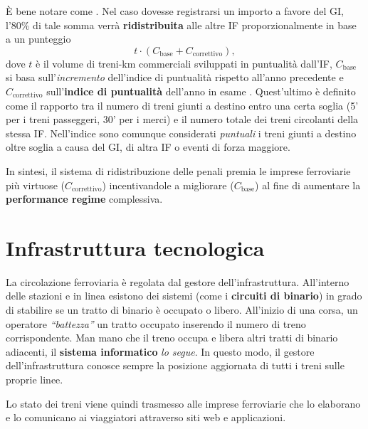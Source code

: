 \documentclass[12pt,italian]{report}
\begin{document}
È bene notare come . Nel caso dovesse registrarsi un importo a favore
del GI, l'80\% di tale somma verrà \textbf{ridistribuita} alle altre
IF proporzionalmente in base a un punteggio
$$
t \cdot (C_\text{base} + C_\text{correttivo}),
$$
dove $t$ è il volume di treni-km commerciali sviluppati in puntualità
dall'IF, $C_\text{base}$ si basa sull'\textit{incremento} dell'indice
di puntualità rispetto all'anno precedente \cite[app.\ 5C, tabella
5a]{RfiPir} e $C_\text{correttivo}$ sull'\textbf{indice di puntualità}
dell'anno in esame \cite[app.\ 5C, tabella 5b]{RfiPir}.  Quest'ultimo
è definito come il rapporto tra il numero di treni giunti a destino
entro una certa soglia (5' per i treni passeggeri, 30' per i merci) e
il numero totale dei treni circolanti della stessa IF\@.  Nell'indice
sono comunque considerati \textit{puntuali} i treni giunti a destino
oltre soglia a causa del GI, di altra IF o eventi di forza maggiore.

In sintesi, il sistema di ridistribuzione delle penali premia le
imprese ferroviarie più virtuose ($C_\text{correttivo}$)
incentivandole a migliorare ($C_\text{base}$) al fine di aumentare la
\textbf{performance regime} complessiva.

\section{Infrastruttura tecnologica}

La circolazione ferroviaria è regolata dal gestore
dell'infrastruttura.  All'interno delle stazioni e in linea esistono
dei sistemi (come i \textbf{circuiti di binario}) in grado di
stabilire se un tratto di binario è occupato o libero.  All'inizio di
una corsa, un operatore \textit{``battezza''} un tratto occupato
inserendo il numero di treno corrispondente.  Man mano che il treno
occupa e libera altri tratti di binario adiacenti, il \textbf{sistema
    informatico} \textit{lo segue}.  In questo modo, il gestore
dell'infrastruttura conosce sempre la posizione aggiornata di tutti i
treni sulle proprie linee.

Lo stato dei treni viene quindi trasmesso alle imprese ferroviarie che
lo elaborano e lo comunicano ai viaggiatori attraverso siti web e
applicazioni.
\end{document}
